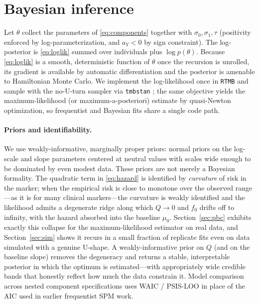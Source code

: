 \documentclass[review,3p,times]{elsarticle}
\newcommand{\fzero}{f_0}
\begin{document}
\section{Bayesian inference}\label{sec:bayes}

Let $\theta$ collect the parameters of \eqref{eq:components} together with
$\sigma_0,\sigma_1,\tau$ (positivity enforced by log-parameterization, and $a_Y<0$
by sign constraint). The log-posterior is \eqref{eq:loglik} summed over individuals
plus $\log p(\theta)$. Because \eqref{eq:loglik} is a smooth, deterministic
function of $\theta$ once the recursion is unrolled, its gradient is available by
automatic differentiation and the posterior is amenable to Hamiltonian Monte
Carlo. We implement the log-likelihood once in \texttt{RTMB} and sample with the
no-U-turn sampler via \texttt{tmbstan} \citep{RTMB,tmbstan2018}; the same objective
yields the maximum-likelihood (or maximum-a-posteriori) estimate by quasi-Newton
optimization, so frequentist and Bayesian fits share a single code path.

\paragraph{Priors and identifiability.} We use weakly-informative, marginally
proper priors: normal priors on the log-scale and slope parameters centered at
neutral values with scales wide enough to be dominated by even modest data. These
priors are not merely a Bayesian formality. The quadratic term in
\eqref{eq:hazard} is identified by \emph{curvature} of risk in the marker; when the
empirical risk is close to monotone over the observed range---as it is for many
clinical markers---the curvature is weakly identified and the likelihood admits a
degenerate ridge along which $Q\to0$ and $\fzero$ drifts off to infinity, with the
hazard absorbed into the baseline $\mu_0$. Section~\ref{sec:pbc} exhibits exactly
this collapse for the maximum-likelihood estimator on real data, and
Section~\ref{sec:sim} shows it recurs in a small fraction of replicate fits even
on data simulated with a genuine U-shape. A weakly-informative prior on
$Q$ (and on the baseline slope) removes the degeneracy and returns a stable,
interpretable posterior in which the optimum is estimated---with appropriately wide
credible bands that honestly reflect how much the data constrain it. Model
comparison across nested component specifications uses WAIC / PSIS-LOO in place of
the AIC used in earlier frequentist SPM work.
\end{document}
